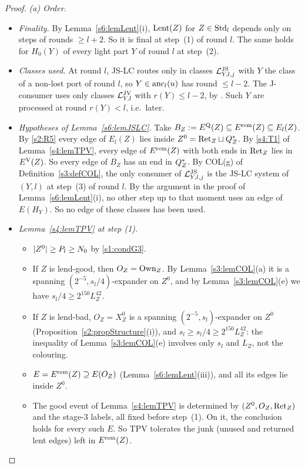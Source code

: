 \begin{proof}
\emph{(a) Order.}
\begin{itemize}
\item \emph{Finality.} By Lemma~\ref{s6:lemLent}(i), $\mathrm{Lent}(Z)$ for $Z\in\mathrm{Std}_l$ depends only on steps of rounds $\ge l+2$. So it is final at step~(1) of round $l$. The same holds for $H_0(Y)$ of every light part $Y$ of round $l$ at step~(2).
\item \emph{Classes used.} At round $l$, JS-LC routes only in classes $\mathcal{L}^{\mathrm{JS}}_{Y,l,j}$ with $Y$ the class of a non-lost port of round $l$, so $Y\in\mathrm{anc}_l(u)$ has round $\le l-2$. The J-consumer uses only classes $\mathcal{L}^{\mathrm{JV}}_{Y,l}$ with $r(Y)\le l-2$, by . Such $Y$ are processed at round $r(Y)<l$, i.e.\ later.
\item \emph{Hypotheses of Lemma~\ref{s6:lemJSLC}.} Take $B_Z:=E^{\mathrm{Q}}(Z)\subseteq E^{\mathrm{rem}}(Z)\subseteq E_l(Z)$. By \ref{s2:R5} every edge of $E_l(Z)$ lies inside $Z^0=\mathrm{Ret}_Z\sqcup Q^{*}_Z$. By \ref{s4:T1} of Lemma~\ref{s4:lemTPV}, every edge of $E^{\mathrm{rem}}(Z)$ with both ends in $\mathrm{Ret}_Z$ lies in $E^{\mathrm{V}}(Z)$. So every edge of $B_Z$ has an end in $Q^{*}_Z$. By COL(g) of Definition~\ref{s3:defCOL}, the only consumer of $\mathcal{L}^{\mathrm{JS}}_{Y,l,j}$ is the JS-LC system of $(Y,l)$ at step~(3) of round $l$. By the argument in the proof of Lemma~\ref{s6:lemLent}(i), no other step up to that moment uses an edge of $E(H_Y)$. So no edge of these classes has been used.
\item \emph{Lemma~\ref{s4:lemTPV} at step (1).}
  \begin{itemize}
  \item $|Z^0|\ge P_l\ge N_{0}$ by \ref{s1:condG3}.
  \item If $Z$ is lend-good, then $O_Z=\mathrm{Own}_Z$. By Lemma~\ref{s3:lemCOL}(a) it is a spanning $(2^{-5},s_l/4)$-expander on $Z^0$, and by Lemma~\ref{s3:lemCOL}(e) we have $s_l/4\ge2^{150}L_Z^{42}$.
  \item If $Z$ is lend-bad, $O_Z=X^0_Z$ is a spanning $(2^{-5},s_l)$-expander on $Z^0$ (Proposition~\ref{s2:propStructure}(i)), and $s_l\ge s_l/4\ge2^{150}L_Z^{42}$: the inequality of Lemma~\ref{s3:lemCOL}(e) involves only $s_l$ and $L_Z$, not the colouring.
  \item $E=E^{\mathrm{rem}}(Z)\supseteq E(O_Z)$ (Lemma~\ref{s6:lemLent}(iii)), and all its edges lie inside $Z^0$.
  \item The good event of Lemma~\ref{s4:lemTPV} is determined by $(Z^0,O_Z,\mathrm{Ret}_Z)$ and the stage-3 labels, all fixed before step~(1). On it, the conclusion holds for every such $E$. So TPV tolerates the junk (unused and returned lent edges) left in $E^{\mathrm{rem}}(Z)$.

\end{itemize}
\end{itemize}
\end{proof}
